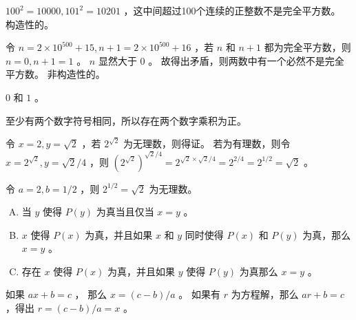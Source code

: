 {{        %
        \begin{practices}
            $100^2 = 10000, 101^2 = 10201$ ，这中间超过100个连续的正整数不是完全平方数。
            构造性的。
        \end{practices}

        \begin{practices}
            令 $n = 2 \times 10^{500} + 15, n + 1 = 2 \times 10^{500} + 16$ ，若 $n$ 和 $n + 1$ 都为完全平方数，则 $n = 0, n + 1 = 1$ 。
            $n$ 显然大于 $0$ 。
            故得出矛盾，则两数中有一个必然不是完全平方数。
            非构造性的。
        \end{practices}

        \begin{practices}
            $0$ 和 $1$ 。
        \end{practices}

        \begin{practices}
            至少有两个数字符号相同，所以存在两个数字乘积为正。
        \end{practices}

        \begin{practices}
            令 $x = 2, y = \sqrt{2}$ ，若 $2^{\sqrt{2}}$ 为无理数，则得证。
            若为有理数，则令 $x = 2^{\sqrt{2}}, y = \sqrt{2} / 4$ ，则 $(2^{\sqrt{2}})^{\sqrt{2} / 4} = 2^{\sqrt{2} \times \sqrt{2} / 4} = 2^{2 / 4} = 2^{1 / 2} = \sqrt{2}$ 。
        \end{practices}

        \begin{practices}
            令 $a = 2, b = 1 / 2$ ，则 $2^{1 / 2} = \sqrt{2}$ 为无理数。
        \end{practices}

        \begin{practices}
            \begin{enumerate}[A.]
                \item 当 $y$ 使得 $P(y)$ 为真当且仅当 $x = y$ 。
                \item $x$ 使得 $P(x)$ 为真，并且如果 $x$ 和 $y$ 同时使得 $P(x)$ 和 $P(y)$ 为真，那么 $x = y$ 。
                \item 存在 $x$ 使得 $P(x)$ 为真，并且如果 $y$ 使得 $P(y)$ 为真那么 $x = y$ 。
            \end{enumerate}
        \end{practices}

        \begin{practices}
            如果 $ax + b = c$ ， 那么 $x = (c - b) / a$ 。
            如果有 $r$ 为方程解，那么 $ar + b = c$ ，得出 $r = (c - b) / a = x$ 。
        \end{practices}

}}
